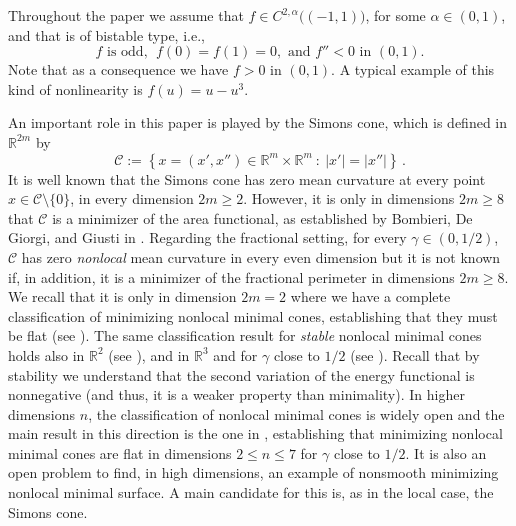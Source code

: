 \documentclass[twoside,leqno,symbols-for-thanks, draft]{rmi}
\numberwithin{equation}{section}
\theoremstyle{definition}
\newcommand{\con}[1]{\mathbb{#1}}
\newcommand{\R}{\con{R}} %
\newcommand{\ccal}{\mathscr{C}}
\newcommand{\s}{\gamma}
\newcommand{\setcond}[2]{\left \{ #1 \ : \ #2  \right \}}
\begin{document}
Throughout the paper we assume that $f\in C^{2,\alpha}\big((-1,1)\big)$, for some $\alpha\in (0,1)$, and that is of bistable type, i.e.,
\begin{equation}\label{Eq:fHypotheses}
f \text{ is odd, }\; f(0)=f(1)=0,\text{ and }
f''<0 \text{ in } (0,1).
\end{equation}
Note that as a consequence we have $f>0$ in $(0,1)$. A typical example of this kind of nonlinearity is $f(u)=u-u^3$.

An important role in this paper is played by the Simons cone, which is defined in $\R^{2m}$ by
$$
\mathscr{C} := \setcond{x = (x', x'') \in \R^{m}\times \R^m}{|x'| = |x''|}\,.
$$
It is well known that the Simons cone has zero mean curvature at every point $x \in \ccal \setminus \{0\}$, in every dimension $2m \geq 2$. However, it is only in dimensions $2m \geq 8$ that $\ccal$ is a minimizer of the area functional, as established by Bombieri, De Giorgi, and Giusti in \cite{BombieriDeGiorgiGiusti}. Regarding the fractional setting, for every $\s\in(0,1/2)$, $\ccal$ has zero \emph{nonlocal} mean curvature in every even dimension but it is not known if, in addition,  it is a minimizer of the fractional perimeter in dimensions $2m\geq 8$. We recall that it is only in dimension $2m=2$ where we have a complete classification of minimizing nonlocal minimal cones, establishing that they must be flat (see \cite{SavinValdinoci-Cones}). The same classification result for \emph{stable} nonlocal minimal cones holds also in $\R^2$ (see \cite{SavinValdinoci-Stable}), and in $\R^3$ and for $\s$ close to $1/2$ (see \cite{CabreCintiSerra-Cones}). Recall that by stability we understand that the second variation of the energy functional is nonnegative (and thus, it is a weaker property than minimality). In higher dimensions $n$, the classification of nonlocal minimal cones is widely open and the main result in this direction is the one in \cite{CaffarelliValdinoci}, establishing that minimizing nonlocal minimal cones are flat in dimensions $2\leq n\leq 7$ for $\gamma$ close to $1/2$.  It is also an open problem to find, in high dimensions, an example of nonsmooth minimizing nonlocal minimal surface. A main candidate for this is, as in the local case, the Simons cone.
\end{document}
